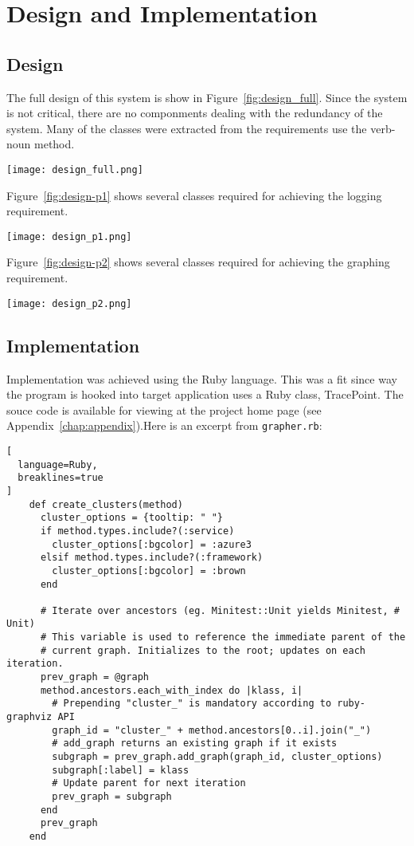 \chapter{Design and Implementation}
\label{chap:design}

\section{Design}
The full design of this system is show in Figure~\ref{fig:design_full}. Since the system is not critical, there are no componments dealing with the redundancy of the system. Many of the classes were extracted from the requirements use the verb-noun method.
\begin{center}
    \texttt{[image: design\_full.png]}
    \label{fig:design_full}
\end{center}

Figure~\ref{fig:design-p1} shows several classes required for achieving the logging requirement.
\begin{center}
    \texttt{[image: design\_p1.png]}
    \label{fig:design-p1}
\end{center}


Figure~\ref{fig:design-p2} shows several classes required for achieving the graphing requirement.
\begin{center}
    \texttt{[image: design\_p2.png]}
    \label{fig:design-p2}
\end{center}

\section{Implementation}
Implementation was achieved using the Ruby language. This was a fit since way the program is hooked into target application uses a Ruby class, TracePoint. The souce code is available for viewing at the project home page (see Appendix~\ref{chap:appendix}).Here is an excerpt from {\lstinline |grapher.rb|}:
\begin{lstlisting}[
  language=Ruby,
  breaklines=true
]
    def create_clusters(method)
      cluster_options = {tooltip: " "}
      if method.types.include?(:service)
        cluster_options[:bgcolor] = :azure3
      elsif method.types.include?(:framework)
        cluster_options[:bgcolor] = :brown
      end

      # Iterate over ancestors (eg. Minitest::Unit yields Minitest, # Unit)
      # This variable is used to reference the immediate parent of the 
      # current graph. Initializes to the root; updates on each iteration.
      prev_graph = @graph 
      method.ancestors.each_with_index do |klass, i|
        # Prepending "cluster_" is mandatory according to ruby-graphviz API
        graph_id = "cluster_" + method.ancestors[0..i].join("_")
        # add_graph returns an existing graph if it exists
        subgraph = prev_graph.add_graph(graph_id, cluster_options)
        subgraph[:label] = klass
        # Update parent for next iteration
        prev_graph = subgraph
      end
      prev_graph
    end
\end{lstlisting}
